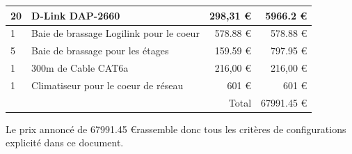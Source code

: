 \begin{center}
\begin{tabular}{|l|p{8cm}|r|r|}
          \hline
            20  & D-Link DAP-2660 & 298,31  \euro & 5966.2  \euro   \\
          \hline
            1  & Baie de brassage Logilink pour le coeur & 578.88  \euro  & 578.88  \euro   \\
          \hline
            5  & Baie de brassage pour les étages & 159.59  \euro & 797.95 \euro  \\
          \hline
            1  & 300m de Cable CAT6a & 216,00 \euro & 216,00 \euro  \\
          \hline
            1  & Climatiseur pour le coeur de réseau & 601 \euro  & 601 \euro   \\
        \hline
             &
    & Total
    & 67991.45 \euro
 \\
          \hline
        \end{tabular}
    \end{center}

Le prix annoncé de 67991.45 \euro  rassemble donc tous les critères de configurations explicité dans ce document.



%
